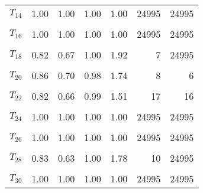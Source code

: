 \begin{table}
\begin{tabular}[t]{lrrrrrr}
$T_{14}$ & 1.00 & 1.00 & 1.00 & 1.00 & 24995 & 24995\\
\cellcolor{gray!6}{$T_{15}$} & \cellcolor{gray!6}{0.89} & \cellcolor{gray!6}{0.79} & \cellcolor{gray!6}{0.99} & \cellcolor{gray!6}{1.83} & \cellcolor{gray!6}{8} & \cellcolor{gray!6}{7}\\
$T_{16}$ & 1.00 & 1.00 & 1.00 & 1.00 & 24995 & 24995\\
\cellcolor{gray!6}{$T_{17}$} & \cellcolor{gray!6}{0.93} & \cellcolor{gray!6}{0.84} & \cellcolor{gray!6}{1.00} & \cellcolor{gray!6}{1.71} & \cellcolor{gray!6}{8} & \cellcolor{gray!6}{24995}\\
$T_{18}$ & 0.82 & 0.67 & 1.00 & 1.92 & 7 & 24995\\
\cellcolor{gray!6}{$T_{19}$} & \cellcolor{gray!6}{1.00} & \cellcolor{gray!6}{1.00} & \cellcolor{gray!6}{1.00} & \cellcolor{gray!6}{1.00} & \cellcolor{gray!6}{24995} & \cellcolor{gray!6}{24995}\\
$T_{20}$ & 0.86 & 0.70 & 0.98 & 1.74 & 8 & 6\\
\cellcolor{gray!6}{$T_{21}$} & \cellcolor{gray!6}{0.79} & \cellcolor{gray!6}{0.66} & \cellcolor{gray!6}{0.91} & \cellcolor{gray!6}{1.79} & \cellcolor{gray!6}{7} & \cellcolor{gray!6}{6}\\
$T_{22}$ & 0.82 & 0.66 & 0.99 & 1.51 & 17 & 16\\
\cellcolor{gray!6}{$T_{23}$} & \cellcolor{gray!6}{0.86} & \cellcolor{gray!6}{0.77} & \cellcolor{gray!6}{0.97} & \cellcolor{gray!6}{1.45} & \cellcolor{gray!6}{11} & \cellcolor{gray!6}{30}\\
$T_{24}$ & 1.00 & 1.00 & 1.00 & 1.00 & 24995 & 24995\\
\cellcolor{gray!6}{$T_{25}$} & \cellcolor{gray!6}{0.85} & \cellcolor{gray!6}{0.62} & \cellcolor{gray!6}{1.00} & \cellcolor{gray!6}{2.15} & \cellcolor{gray!6}{7} & \cellcolor{gray!6}{24995}\\
$T_{26}$ & 1.00 & 1.00 & 1.00 & 1.00 & 24995 & 24995\\
\cellcolor{gray!6}{$T_{27}$} & \cellcolor{gray!6}{0.89} & \cellcolor{gray!6}{0.75} & \cellcolor{gray!6}{1.00} & \cellcolor{gray!6}{1.94} & \cellcolor{gray!6}{7} & \cellcolor{gray!6}{24995}\\
$T_{28}$ & 0.83 & 0.63 & 1.00 & 1.78 & 10 & 24995\\
\cellcolor{gray!6}{$T_{29}$} & \cellcolor{gray!6}{0.98} & \cellcolor{gray!6}{0.93} & \cellcolor{gray!6}{1.00} & \cellcolor{gray!6}{1.57} & \cellcolor{gray!6}{9} & \cellcolor{gray!6}{24995}\\
$T_{30}$ & 1.00 & 1.00 & 1.00 & 1.00 & 24995 & 24995\\

\end{tabular}
\end{table}
